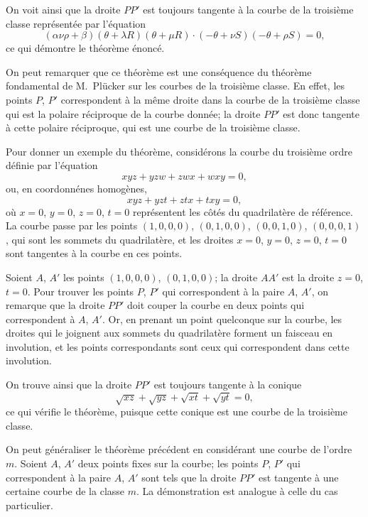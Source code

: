 \documentclass[11pt,a4paper]{article}
\begin{document}
On voit ainsi que la droite $PP'$ est toujours tangente \`{a} la courbe de la troisi\`{e}me
classe repr\'{e}sent\'{e}e par l'\'{e}quation
\[
(\alpha\nu\rho + \beta)(\theta + \lambda R)(\theta + \mu R) \cdot (-\theta + \nu S)(-\theta + \rho S) = 0,
\]
ce qui d\'{e}montre le th\'{e}or\`{e}me \'{e}nonc\'{e}.

On peut remarquer que ce th\'{e}or\`{e}me est une cons\'{e}quence du th\'{e}or\`{e}me fondamental
de M.~Pl\"{u}cker sur les courbes de la troisi\`{e}me classe. En effet, les points $P$, $P'$ correspondent
\`{a} la m\^{e}me droite dans la courbe de la troisi\`{e}me classe qui est la polaire r\'{e}ciproque de la
courbe donn\'{e}e; la droite $PP'$ est donc tangente \`{a} cette polaire r\'{e}ciproque, qui est une
courbe de la troisi\`{e}me classe.

\newpage
\setcounter{page}{189}

Pour donner un exemple du th\'{e}or\`{e}me, consid\'{e}rons la courbe du troisi\`{e}me ordre
d\'{e}finie par l'\'{e}quation
\[
xyz + yzw + zwx + wxy = 0,
\]
ou, en coordonn\'{e}nes homog\`{e}nes,
\[
xyz + yzt + ztx + txy = 0,
\]
o\`{u} $x=0$, $y=0$, $z=0$, $t=0$ repr\'{e}sentent les c\^{o}t\'{e}s du quadrilat\`{e}re de r\'{e}f\'{e}rence. La
courbe passe par les points $(1,0,0,0)$, $(0,1,0,0)$, $(0,0,1,0)$, $(0,0,0,1)$, qui sont les
sommets du quadrilat\`{e}re, et les droites $x=0$, $y=0$, $z=0$, $t=0$ sont tangentes \`{a} la courbe
en ces points.

Soient $A$, $A'$ les points $(1,0,0,0)$, $(0,1,0,0)$; la droite $AA'$ est la droite $z=0$, $t=0$.
Pour trouver les points $P$, $P'$ qui correspondent \`{a} la paire $A$, $A'$, on remarque que la
droite $PP'$ doit couper la courbe en deux points qui correspondent \`{a} $A$, $A'$. Or, en
prenant un point quelconque sur la courbe, les droites qui le joignent aux sommets du
quadrilat\`{e}re forment un faisceau en involution, et les points correspondants sont ceux
qui correspondent dans cette involution.

On trouve ainsi que la droite $PP'$ est toujours tangente \`{a} la conique
\[
\sqrt{xz} + \sqrt{yz} + \sqrt{xt} + \sqrt{yt} = 0,
\]
ce qui v\'{e}rifie le th\'{e}or\`{e}me, puisque cette conique est une courbe de la troisi\`{e}me classe.

\newpage
\setcounter{page}{190}

On peut g\'{e}n\'{e}raliser le th\'{e}or\`{e}me pr\'{e}c\'{e}dent en consid\'{e}rant une courbe de l'ordre $m$.
Soient $A$, $A'$ deux points fixes sur la courbe; les points $P$, $P'$ qui correspondent \`{a}
la paire $A$, $A'$ sont tels que la droite $PP'$ est tangente \`{a} une certaine courbe de la
classe $m$. La d\'{e}monstration est analogue \`{a} celle du cas particulier.
\end{document}

